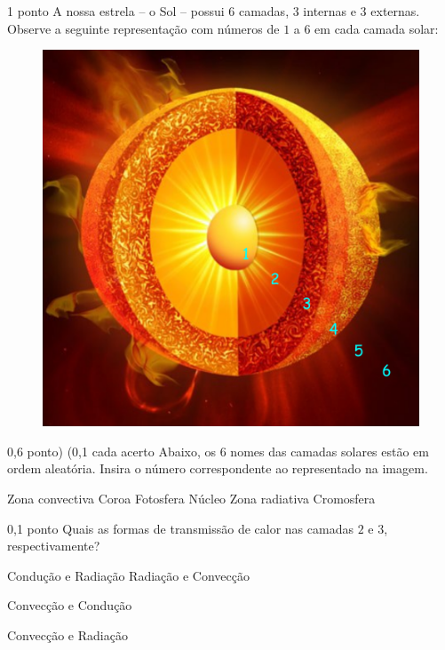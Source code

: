 \documentclass{../lista}
\begin{document}
	
	\begin{questao}{1 ponto}
		A nossa estrela -- o Sol -- possui 6 camadas, 3 internas e 3 externas. Observe a seguinte representação com números de $1$ a $6$ em cada camada solar:
		\begin{figure}[H]
			\centering
			\includegraphics[scale=0.6]{./img/1.png}
		\end{figure}

		\begin{pergunta}{0,6 ponto) (0,1 cada acerto}
			Abaixo, os 6 nomes das camadas solares estão em ordem aleatória. Insira o número correspondente ao representado na imagem.
			\begin{multicols}{2} \begin{alternativas}
				\alternativaMarcada[$\red{3}$] Zona convectiva
				\alternativaMarcada[$\red{6}$] Coroa
				\alternativaMarcada[$\red{4}$] Fotosfera
				\alternativaMarcada[$\red{1}$] Núcleo
				\alternativaMarcada[$\red{2}$] Zona radiativa
				\alternativaMarcada[$\red{5}$] Cromosfera
			\end{alternativas} \end{multicols}
		\end{pergunta}

		\begin{pergunta}{0,1 ponto}
			Quais as formas de transmissão de calor nas camadas $2$ e $3$, respectivamente?
			\begin{alternativas}
				\item Condução e Radiação
				\alternativaMarcada Radiação e Convecção
				\item Convecção e Condução
				\item Convecção e Radiação
			\end{alternativas}
		\end{pergunta}


\end{questao}
\end{document}
